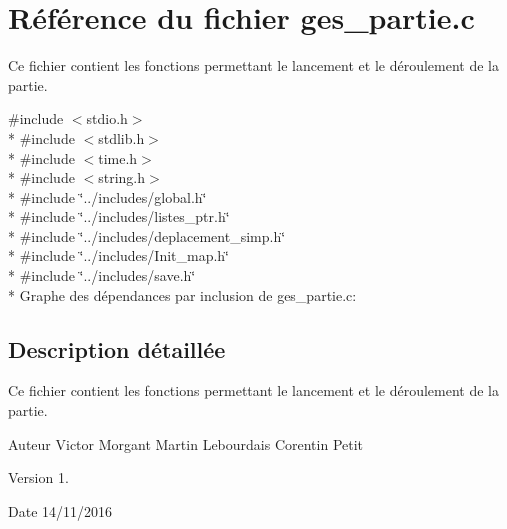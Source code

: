 \hypertarget{a00020}{}\section{Référence du fichier ges\+\_\+partie.\+c}
\label{a00020}


Ce fichier contient les fonctions permettant le lancement et le déroulement de la partie.  


{\ttfamily \#include $<$stdio.\+h$>$}\\*
{\ttfamily \#include $<$stdlib.\+h$>$}\\*
{\ttfamily \#include $<$time.\+h$>$}\\*
{\ttfamily \#include $<$string.\+h$>$}\\*
{\ttfamily \#include \char`\"{}../includes/global.\+h\char`\"{}}\\*
{\ttfamily \#include \char`\"{}../includes/listes\+\_\+ptr.\+h\char`\"{}}\\*
{\ttfamily \#include \char`\"{}../includes/deplacement\+\_\+simp.\+h\char`\"{}}\\*
{\ttfamily \#include \char`\"{}../includes/\+Init\+\_\+map.\+h\char`\"{}}\\*
{\ttfamily \#include \char`\"{}../includes/save.\+h\char`\"{}}\\*
Graphe des dépendances par inclusion de ges\+\_\+partie.\+c\+:


\subsection{Description détaillée}
Ce fichier contient les fonctions permettant le lancement et le déroulement de la partie. 

\begin{DoxyAuthor}{Auteur}
Victor Morgant Martin Lebourdais Corentin Petit 
\end{DoxyAuthor}
\begin{DoxyVersion}{Version}
1. 
\end{DoxyVersion}
\begin{DoxyDate}{Date}
14/11/2016 
\end{DoxyDate}
